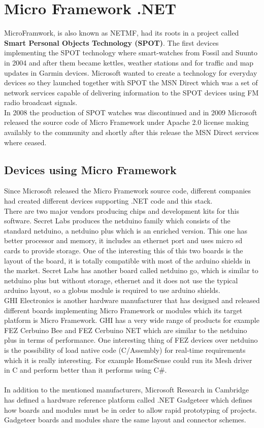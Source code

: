 \section{Micro Framework .NET}\label{S:MicroFramework-dotNet}
MicroFramwork, is also known as NETMF, had its roots in a project called \textbf{Smart Personal Objects Technology (SPOT)}. The first devices implementing the SPOT technology where smart-watches from Fossil and Suunto in 2004 and after them became kettles, weather stations and for traffic and map updates in Garmin devices. Microsoft wanted to create a technology for everyday devices so they launched together with SPOT the MSN Direct which was a set of network services capable of delivering information to the SPOT devices using FM radio broadcast signals.
\\
In 2008 the production of SPOT watches was discontinued and in 2009 Microsoft released the source code of Micro Framework under Apache 2.0 license making availably to the community and shortly after this release the MSN Direct services where ceased.

\subsection{Devices using Micro Framework}\label{SS:MicroFramework-Devices}
Since Microsoft released the Micro Framework source code, different companies had created different devices supporting .NET code and this stack.
\\
There are two major vendors producing chips and development kits for this software. Secret Labs produces the netduino family which consists of the standard netduino, a netduino plus which is an enriched version. This one has better processor and memory, it includes an ethernet port and uses micro sd cards to provide storage. One of the interesting this of this two boards is the layout of the board, it is totally compatible with most of the arduino shields in the market.
Secret Labs has another board called netduino go, which is similar to netduino plus but without storage, ethernet and it does not use the typical arduino layout, so a globus module is required to use arduino shields.
\\
GHI Electronics is another hardware manufacturer that has designed and released different boards implementing Micro Framework or modules which its target platform is Micro Framework. GHI has a very wide range of products for example FEZ Cerbuino Bee and FEZ Cerbuino NET which are similar to the netduino plus in terms of performance. One interesting thing of FEZ devices over netduino is the possibility of load native code (C/Assembly) for real-time requirements which it is really interesting. For example HomeSense could run its Mesh driver in C and perform better than it performs using C\#.
\\
\\
In addition to the mentioned manufacturers, Microsoft Research in Cambridge has defined a hardware reference platform called .NET Gadgeteer which defines how boards and modules must be in order to allow rapid prototyping of projects. Gadgeteer boards and modules share the same layout and connector schemes.
